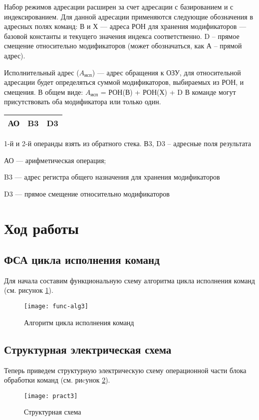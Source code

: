 \documentclass[a4paper,14pt]{extarticle}
\begin{document}
	Набор режимов адресации расширен за счет адресации с базированием и с индексированием. Для данной адресации применяются следующие обозначения в
	адресных полях команд: В и Х --- адреса РОН для хранения модификаторов --- базовой константы и текущего значения индекса соответственно. D – прямое
	смещение относительно модификаторов (может обозначаться, как А – прямой
	адрес).
	
	Исполнительный адрес ($A_{исп}$) --- адрес обращения к ОЗУ, для относительной адресации будет определяться суммой модификаторов, выбираемых из
	РОН, и смещения. В общем виде:
	$A_{исп}$ = РОН(В) + РОН(Х) + D
	В команде могут присутствовать оба модификатора или только один.
	
	\begin{center}
		\begin{tabular}{|c|c|c|}
			\hline
			АО & B3 &D3  \\
			\hline
		\end{tabular}
	\end{center}
	
	1-й и 2-й операнды взять из обратного стека. В3, D3 – адресные поля
	результата
	
	
	АО --- арифметическая операция;
	
	B3 --- адрес регистра общего назначения для хранения модификаторов
	
	D3 --- прямое смещение относительно модификаторов
	
	
	\section*{Ход работы}
	
	\subsection*{ФСА цикла исполнения команд}
	
	Для начала составим функциональную схему алгоритма цикла исполнения команд (см. рисунок \ref{fig:func-alg}).
	
	
	\begin{figure}[htbp]
		\centering
		\texttt{[image: func-alg3]}
		\caption{Алгоритм цикла исполнения команд}
		\label{fig:func-alg}
	\end{figure}
	\newpage
	
	\subsection*{Структурная электрическая схема}
	Теперь приведем структурную электрическую схему операционной части блока обработки команд (см. риcунок \ref{fig:unit}).
	\begin{figure}[htpb]
		\centering
		\texttt{[image: pract3]}
		\caption{Структурная схема}
		\label{fig:unit}
	\end{figure}
	
\end{document}
